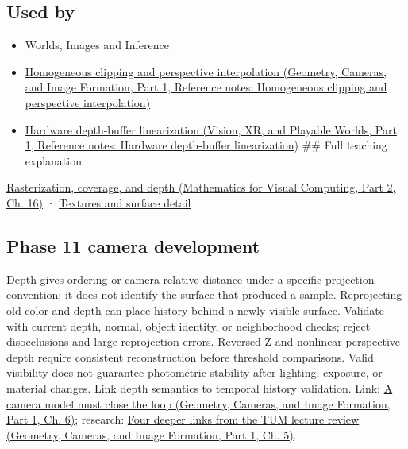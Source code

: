 \subsection{Used by}\label{appendix-97578ed97952-used-by}

\hypertarget{appendix-97578ed97952-used-by}{}

\begin{itemize}
\item
  {Worlds, Images and Inference}
\item
  \href{../03-Geometry-Cameras-and-Image-Formation-P01/main.pdf\#appendix-40426e4b2103}{Homogeneous clipping and perspective interpolation (Geometry, Cameras, and Image Formation, Part 1, Reference notes: Homogeneous clipping and perspective interpolation)}
\item
  \href{../07-Vision-XR-and-Playable-Worlds-P01/main.pdf\#appendix-1bc40b08db4a}{Hardware depth-buffer linearization (Vision, XR, and Playable Worlds, Part 1, Reference notes: Hardware depth-buffer linearization)} \#\# Full teaching explanation
\end{itemize}

\href{../02-Mathematics-for-Visual-Computing-P02/main.pdf\#03-visual-computing-i-ch012-rasterization-coverage-and-depth}{Rasterization, coverage, and depth (Mathematics for Visual Computing, Part 2, Ch. 16)} · \hyperref[03-visual-computing-i-ch019-textures-and-surface-detail]{Textures and surface detail}

\subsection{Phase 11 camera development}\label{appendix-97578ed97952-phase-11-camera-development}

\hypertarget{appendix-97578ed97952-phase-11-camera-development}{}

Depth gives ordering or camera-relative distance under a specific projection convention; it does not identify the surface that produced a sample. Reprojecting old color and depth can place history behind a newly visible surface. Validate with current depth, normal, object identity, or neighborhood checks; reject disocclusions and large reprojection errors. Reversed-Z and nonlinear perspective depth require consistent reconstruction before threshold comparisons. Valid visibility does not guarantee photometric stability after lighting, exposure, or material changes. Link depth semantics to temporal history validation. Link: \href{../03-Geometry-Cameras-and-Image-Formation-P01/main.pdf\#02-foundations-ii-ch037-a-camera-model-must-close-the-loop}{A camera model must close the loop (Geometry, Cameras, and Image Formation, Part 1, Ch. 6)}; research: \href{../03-Geometry-Cameras-and-Image-Formation-P01/main.pdf\#02-foundations-ii-ch036-four-deeper-links-from-the-tum-lecture-review}{Four deeper links from the TUM lecture review (Geometry, Cameras, and Image Formation, Part 1, Ch. 5)}.
